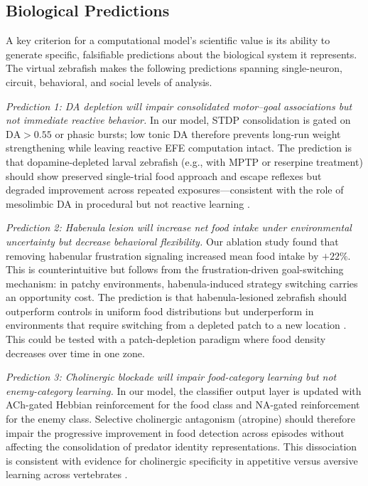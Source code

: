 \documentclass[12pt]{article}
\begin{document}
\subsection{Biological Predictions}

A key criterion for a computational model's scientific value is its
ability to generate specific, falsifiable predictions about the
biological system it represents.
The virtual zebrafish makes the following predictions spanning
single-neuron, circuit, behavioral, and social levels of analysis.

\textit{Prediction 1: DA depletion will impair consolidated
motor--goal associations but not immediate reactive behavior.}
In our model, STDP consolidation is gated on $\text{DA} > 0.55$
or phasic bursts; low tonic DA therefore prevents long-run
weight strengthening while leaving reactive EFE computation intact.
The prediction is that dopamine-depleted larval zebrafish (e.g.,
with MPTP or reserpine treatment) should show preserved single-trial
food approach and escape reflexes but degraded improvement across
repeated exposures---consistent with the role of mesolimbic DA
in procedural but not reactive learning \citep{schultz1997}.

\textit{Prediction 2: Habenula lesion will increase net food intake
under environmental uncertainty but decrease behavioral flexibility.}
Our ablation study found that removing habenular frustration signaling
increased mean food intake by $+22\%$.
This is counterintuitive but follows from the frustration-driven
goal-switching mechanism: in patchy environments, habenula-induced
strategy switching carries an opportunity cost.
The prediction is that habenula-lesioned zebrafish should outperform
controls in uniform food distributions but underperform in environments
that require switching from a depleted patch to a new location
\citep{amo2014}.
This could be tested with a patch-depletion paradigm where food
density decreases over time in one zone.

\textit{Prediction 3: Cholinergic blockade will impair food-category
learning but not enemy-category learning.}
In our model, the classifier output layer is updated with ACh-gated
Hebbian reinforcement for the food class and NA-gated reinforcement
for the enemy class.
Selective cholinergic antagonism (atropine) should therefore impair
the progressive improvement in food detection across episodes without
affecting the consolidation of predator identity representations.
This dissociation is consistent with evidence for cholinergic
specificity in appetitive versus aversive learning across vertebrates
\citep{daw2011}.
\end{document}
